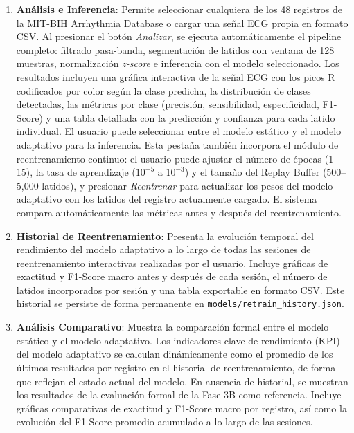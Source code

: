\begin{enumerate}
\item \textbf{Análisis e Inferencia}: Permite seleccionar cualquiera de los 48 registros de la MIT-BIH Arrhythmia Database o cargar una señal ECG propia en formato CSV. Al presionar el botón \textit{Analizar}, se ejecuta automáticamente el pipeline completo: filtrado pasa-banda, segmentación de latidos con ventana de 128 muestras, normalización \textit{z-score} e inferencia con el modelo seleccionado. Los resultados incluyen una gráfica interactiva de la señal ECG con los picos R codificados por color según la clase predicha, la distribución de clases detectadas, las métricas por clase (precisión, sensibilidad, especificidad, F1-Score) y una tabla detallada con la predicción y confianza para cada latido individual. El usuario puede seleccionar entre el modelo estático y el modelo adaptativo para la inferencia. Esta pestaña también incorpora el módulo de reentrenamiento continuo: el usuario puede ajustar el número de épocas (1–15), la tasa de aprendizaje ($10^{-5}$ a $10^{-3}$) y el tamaño del Replay Buffer (500–5,000 latidos), y presionar \textit{Reentrenar} para actualizar los pesos del modelo adaptativo con los latidos del registro actualmente cargado. El sistema compara automáticamente las métricas antes y después del reentrenamiento.

\item \textbf{Historial de Reentrenamiento}: Presenta la evolución temporal del rendimiento del modelo adaptativo a lo largo de todas las sesiones de reentrenamiento interactivas realizadas por el usuario. Incluye gráficas de exactitud y F1-Score macro antes y después de cada sesión, el número de latidos incorporados por sesión y una tabla exportable en formato CSV. Este historial se persiste de forma permanente en \texttt{models/retrain\_history.json}.

\item \textbf{Análisis Comparativo}: Muestra la comparación formal entre el modelo estático y el modelo adaptativo. Los indicadores clave de rendimiento (KPI) del modelo adaptativo se calculan dinámicamente como el promedio de los últimos resultados por registro en el historial de reentrenamiento, de forma que reflejan el estado actual del modelo. En ausencia de historial, se muestran los resultados de la evaluación formal de la Fase 3B como referencia. Incluye gráficas comparativas de exactitud y F1-Score macro por registro, así como la evolución del F1-Score promedio acumulado a lo largo de las sesiones.
\end{enumerate}

